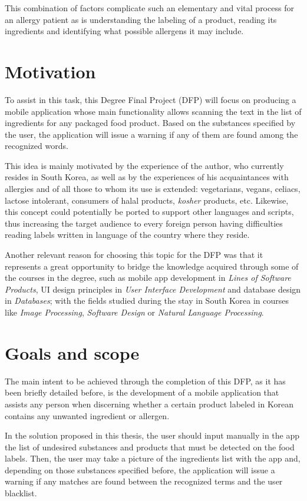 This combination of factors complicate such an elementary and vital process for an allergy patient as is understanding the labeling of a product, reading its ingredients and identifying what possible allergens it may include.

\section{Motivation}
    
To assist in this task, this Degree Final Project (DFP) will focus on producing a mobile application whose main functionality allows scanning the text in the list of ingredients for any packaged food product. Based on the substances specified by the user, the application will issue a warning if any of them are found among the recognized words.
    
This idea is mainly motivated by the experience of the author, who currently resides in South Korea, as well as by the experiences of his acquaintances with allergies and of all those to whom its use is extended: vegetarians, vegans, celiacs, lactose intolerant, consumers of halal products, \textit{kosher} products, etc. Likewise, this concept could potentially be ported to support other languages and scripts, thus increasing the target audience to every foreign person having difficulties reading labels written in language of the country where they reside.

Another relevant reason for choosing this topic for the DFP was that it represents a great opportunity to bridge the knowledge acquired through some of the courses in the degree, such as mobile app development in \textit{Lines of Software Products}, UI design principles in \textit{User Interface Development} and database design in \textit{Databases}; with the fields studied during the stay in South Korea in courses like \textit{Image Processing}, \textit{Software Design} or \textit{Natural Language Processing}.

\section{Goals and scope}

The main intent to be achieved through the completion of this DFP, as it has been briefly detailed before, is the development of a mobile application that assists any person when discerning whether a certain product labeled in Korean contains any unwanted ingredient or allergen.

In the solution proposed in this thesis, the user should input manually in the app the list of undesired substances and products that must be detected on the food labels. Then, the user may take a picture of the ingredients list with the app and, depending on those substances specified before, the application will issue a warning if any matches are found between the recognized terms and the user blacklist.


